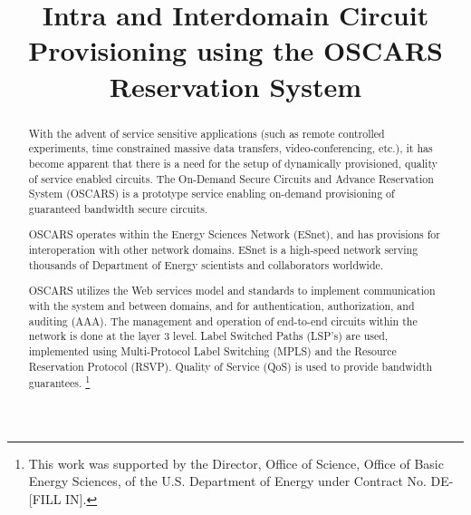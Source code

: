 \documentclass[conference]{IEEEtran}
\begin{document}
\title{Intra and Interdomain Circuit Provisioning using the OSCARS Reservation System}

% 
\author{
}

\maketitle

\begin{abstract}
With the advent of service sensitive applications (such as remote controlled 
experiments, time constrained massive data transfers, video-conferencing, etc.),
it has become apparent that there is a need for the setup of dynamically 
provisioned, quality of service enabled circuits.
The On-Demand Secure Circuits and Advance Reservation System (OSCARS) is 
a prototype service enabling on-demand provisioning of guaranteed bandwidth 
secure circuits.

OSCARS operates within the Energy Sciences Network (ESnet), and has
provisions for interoperation with other network domains.
ESnet is a high-speed network serving thousands 
of Department of Energy scientists and collaborators worldwide.

OSCARS utilizes the Web services model and standards to implement communication
with the system and between domains, and for authentication, authorization,
and auditing (AAA).  The management and operation of end-to-end circuits 
within the network is done at the layer 3 level.  Label Switched Paths 
(LSP's) are used, implemented using Multi-Protocol Label Switching (MPLS) and 
the Resource Reservation Protocol (RSVP). Quality of Service (QoS) is used to 
provide bandwidth guarantees.
\footnote{
This work was supported by the Director, Office of Science, Office of 
Basic Energy Sciences, of the U.S. Department of Energy under Contract No. 
DE-[FILL IN].}
\end{abstract}


%
\IEEEpeerreviewmaketitle
\end{document}
